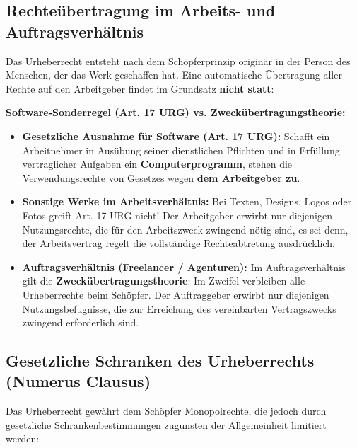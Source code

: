 \subsection{Rechteübertragung im Arbeits- und Auftragsverhältnis}

Das Urheberrecht entsteht nach dem Schöpferprinzip originär in der Person des Menschen, der das Werk geschaffen hat. Eine automatische Übertragung aller Rechte auf den Arbeitgeber findet im Grundsatz \textbf{nicht statt}:

\begin{theorem}
    \textbf{Software-Sonderregel (Art. 17 URG) vs. Zweckübertragungstheorie:}
    \begin{itemize}
        \item \textbf{Gesetzliche Ausnahme für Software (Art. 17 URG):} Schafft ein Arbeitnehmer in Ausübung seiner dienstlichen Pflichten und in Erfüllung vertraglicher Aufgaben ein \textbf{Computerprogramm}, stehen die Verwendungsrechte von Gesetzes wegen \textbf{dem Arbeitgeber zu}.
        \item \textbf{Sonstige Werke im Arbeitsverhältnis:} Bei Texten, Designs, Logos oder Fotos greift Art. 17 URG nicht! Der Arbeitgeber erwirbt nur diejenigen Nutzungsrechte, die für den Arbeitszweck zwingend nötig sind, es sei denn, der Arbeitsvertrag regelt die vollständige Rechteabtretung ausdrücklich.
        \item \textbf{Auftragsverhältnis (Freelancer / Agenturen):} Im Auftragsverhältnis gilt die \textbf{Zweckübertragungstheorie}: Im Zweifel verbleiben alle Urheberrechte beim Schöpfer. Der Auftraggeber erwirbt nur diejenigen Nutzungsbefugnisse, die zur Erreichung des vereinbarten Vertragszwecks zwingend erforderlich sind.
    \end{itemize}
\end{theorem}

\subsection{Gesetzliche Schranken des Urheberrechts (Numerus Clausus)}

Das Urheberrecht gewährt dem Schöpfer Monopolrechte, die jedoch durch gesetzliche Schrankenbestimmungen zugunsten der Allgemeinheit limitiert werden:

